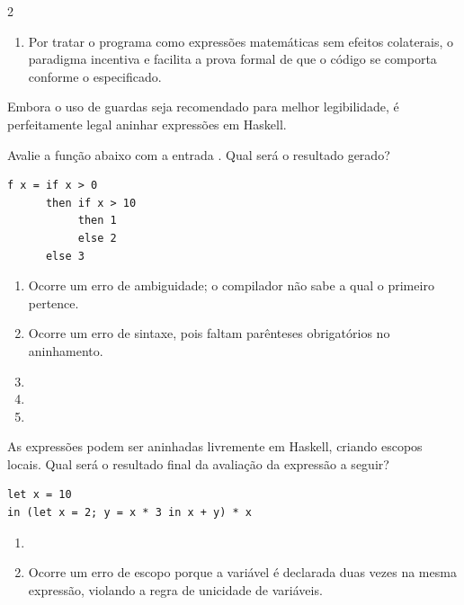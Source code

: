 \documentclass[a4paper,10pt,brazil]{article}
\begin{document}
\begin{multicols}{2}
\begin{enumerate}
  \item Por tratar o programa como expressões matemáticas sem efeitos colaterais, o paradigma incentiva e facilita a prova formal de que o código se comporta conforme o especificado.


\end{enumerate}

Embora o uso de guardas seja recomendado para melhor legibilidade, é perfeitamente legal aninhar expressões  em Haskell. 

Avalie a função abaixo com a entrada . Qual será o resultado gerado?
\begin{verbatim}
f x = if x > 0
      then if x > 10
           then 1
           else 2
      else 3
\end{verbatim}

\begin{enumerate}
  \item Ocorre um erro de ambiguidade; o compilador não sabe a qual  o primeiro  pertence.

  \item Ocorre um erro de sintaxe, pois faltam parênteses obrigatórios no aninhamento.

  \item {}

  \item {}

  \item {}


\end{enumerate}

As expressões  podem ser aninhadas livremente em Haskell, criando escopos locais. Qual será o resultado final da avaliação da expressão a seguir?
\begin{verbatim}
let x = 10 
in (let x = 2; y = x * 3 in x + y) * x
\end{verbatim}

\begin{enumerate}
  \item {}

  \item Ocorre um erro de escopo porque a variável  é declarada duas vezes na mesma expressão, violando a regra de unicidade de variáveis.


\end{enumerate}
\end{multicols}
\end{document}
